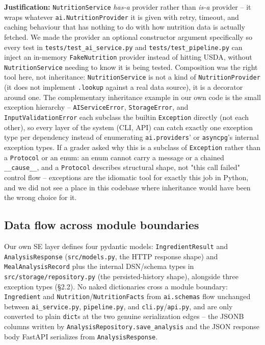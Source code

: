 \documentclass[11pt,a4paper]{article}
\begin{document}
\textbf{Justification:} \texttt{NutritionService} \emph{has-a} provider rather than \emph{is-a} provider -- it wraps whatever \texttt{ai.NutritionProvider} it is given with retry, timeout, and caching behaviour that has nothing to do with how nutrition data is actually fetched. We made the provider an optional constructor argument specifically so every test in \texttt{tests/test\_ai\_service.py} and \texttt{tests/test\_pipeline.py} can inject an in-memory \texttt{FakeNutrition} provider instead of hitting USDA, without \texttt{NutritionService} needing to know it is being tested. Composition was the right tool here, not inheritance: \texttt{NutritionService} is not a kind of \texttt{NutritionProvider} (it does not implement \texttt{.lookup} against a real data source), it is a decorator around one. The complementary inheritance example in our own code is the small exception hierarchy -- \texttt{AIServiceError}, \texttt{StorageError}, and \texttt{InputValidationError} each subclass the builtin \texttt{Exception} directly (not each other), so every layer of the system (CLI, API) can catch exactly one exception type per dependency instead of enumerating \texttt{ai.providers}' or \texttt{asyncpg}'s internal exception types. If a grader asked why this is a subclass of \texttt{Exception} rather than a \texttt{Protocol} or an enum: an enum cannot carry a message or a chained \texttt{\_\_cause\_\_}, and a \texttt{Protocol} describes structural shape, not "this call failed" control flow -- exceptions are the idiomatic tool for exactly this job in Python, and we did not see a place in this codebase where inheritance would have been the wrong choice for it.

\subsection{Data flow across module boundaries}

Our own SE layer defines four pydantic models: \texttt{IngredientResult} and \texttt{AnalysisResponse} (\texttt{src/models.py}, the HTTP response shape) and \texttt{MealAnalysisRecord} plus the internal DSN/schema types in \texttt{src/storage/repository.py} (the persisted-history shape), alongside three exception types (\S2.2). No naked dictionaries cross a module boundary: \texttt{Ingredient} and \texttt{Nutrition}/\texttt{NutritionFacts} from \texttt{ai.schemas} flow unchanged between \texttt{ai\_service.py}, \texttt{pipeline.py}, and \texttt{cli.py}/\texttt{api.py}, and are only converted to plain \texttt{dict}s at the two genuine serialization edges -- the JSONB columns written by \texttt{AnalysisRepository.save\_analysis} and the JSON response body FastAPI serializes from \texttt{AnalysisResponse}.
\end{document}
